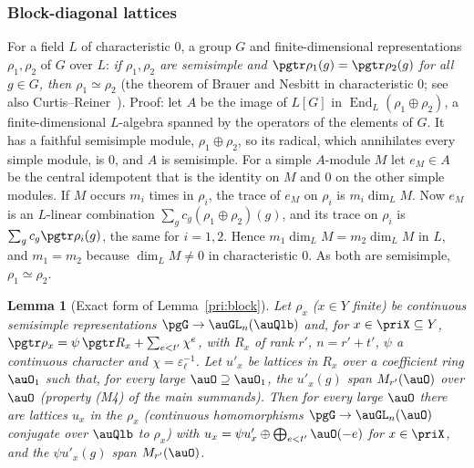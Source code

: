 \documentclass[10pt]{amsart}
\newtheorem{lemma}[theorem]{Lemma}
\theoremstyle{definition}
\theoremstyle{remark}
\begin{document}
\subsubsection{Block-diagonal lattices}\label{pax:ss-block}

For a field $L$ of characteristic $0$, a group $G$ and finite-dimensional representations $\rho_1,
\rho_2$ of $G$ over $L$: \emph{if $\rho_1,\rho_2$ are semisimple and $\pgtr\rho_1(g)=\pgtr\rho_2(g)$
for all $g\in G$, then $\rho_1\simeq\rho_2$} (the theorem of Brauer and Nesbitt in characteristic $0$; see also
Curtis--Reiner~\cite{CurtisReiner}). Proof: let $A$ be the image of $L[G]$ in
$\operatorname{End}_L(\rho_1\oplus\rho_2)$, a finite-dimensional $L$-algebra spanned by the operators of the
elements of $G$. It has a faithful semisimple module, $\rho_1\oplus\rho_2$, so its radical, which
annihilates every simple module, is $0$, and $A$ is semisimple. For a simple $A$-module $M$ let $e_M\in A$ be
the central idempotent that is the identity on $M$ and $0$ on the other simple modules. If $M$ occurs
$m_i$ times in $\rho_i$, the trace of $e_M$ on $\rho_i$ is $m_i\dim_LM$. Now $e_M$ is an $L$-linear
combination $\sum_gc_g(\rho_1\oplus\rho_2)(g)$, and its trace on $\rho_i$ is $\sum_gc_g\pgtr\rho_i(g)$,
the same for $i=1,2$. Hence $m_1\dim_LM=m_2\dim_LM$ in $L$, and $m_1=m_2$ because $\dim_LM\ne0$ in
characteristic $0$. As both are semisimple, $\rho_1\simeq\rho_2$.

\begin{lemma}[Exact form of Lemma~\ref{pri:block}]\label{pax:block}
Let $\rho_x$ ($x\in Y$ finite) be continuous \emph{semisimple} representations $\pgG\to\auGL_n(\auQlb)$
and, for $x\in\priX\subseteq Y$, $\pgtr\rho_x=\psi\,\pgtr R_x+\sum_{e<t'}\chi^e$, with $R_x$ of rank
$r'$, $n=r'+t'$, $\psi$ a continuous character and $\chi=\varepsilon_\ell^{-1}$. Let $u'_x$ be
lattices in $R_x$ over a coefficient ring $\auO_1$ such that, for every large $\auO\supseteq\auO_1$,
the $u'_x(g)$ span $M_{r'}(\auO)$ over $\auO$ (property (M4) of the main summands). Then for every large
$\auO$ there are lattices $u_x$ in the $\rho_x$ (continuous homomorphisms $\pgG\to\auGL_n(\auO)$
conjugate over $\auQlb$ to $\rho_x$) with $u_x=\psi u'_x\oplus\bigoplus_{e<t'}\auO(-e)$ for $x\in
\priX$, and the $\psi u'_x(g)$ span $M_{r'}(\auO)$.
\end{lemma}
\end{document}
